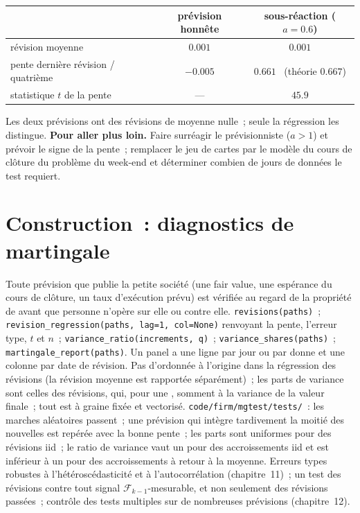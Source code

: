 \begin{tutorial}
\begin{center}
\begin{tabular}{@{}lcc@{}}
\toprule
 & prévision honnête & sous-réaction ($a = 0.6$) \\
\midrule
révision moyenne & $0.001$ & $0.001$ \\
pente dernière révision / quatrième & $-0.005$ & $0.661$ \ (théorie $0.667$) \\
statistique $t$ de la pente & --- & $45.9$ \\
\bottomrule
\end{tabular}
\end{center}
Les deux prévisions ont des révisions de moyenne nulle~; seule la régression les distingue.
\textbf{Pour aller plus loin.} Faire surréagir le prévisionniste ($a > 1$) et prévoir le signe de
la pente~; remplacer le jeu de cartes par le modèle du cours de clôture du problème du week-end et déterminer
combien de jours de données le test requiert.
\end{tutorial}


\section{Construction~: diagnostics de martingale}\label{bld:qm:probability-at-speed:mgtest}

\begin{build}
 Toute prévision que publie la petite société (une fair value, une espérance du
cours de clôture, un taux d'exécution prévu) est vérifiée au regard de la propriété de  avant que personne
n'opère sur elle ou contre elle.
 \texttt{revisions(paths)}~; \texttt{revision\_regression(paths, lag=1,
col=None)} renvoyant la pente, l'erreur type, $t$ et $n$~; \texttt{variance\_ratio(increments,
q)}~; \texttt{variance\_shares(paths)}~; \texttt{martingale\_report(paths)}. Un panel a une
ligne par jour ou par donne et une colonne par date de révision.
 Pas d'ordonnée à l'origine dans la régression des révisions (la révision moyenne est rapportée
séparément)~; les parts de variance sont celles des révisions, qui, pour une , somment à la
variance de la valeur finale~; tout est à graine fixée et vectorisé.
 \texttt{code/firm/mgtest/tests/}~: les marches aléatoires passent~; une prévision
qui intègre tardivement la moitié des nouvelles est repérée avec la bonne pente~; les parts sont uniformes pour des
révisions iid~; le ratio de variance vaut un pour des accroissements iid et est inférieur à un pour des
accroissements à retour à la moyenne.
 Erreurs types robustes à l'hétéroscédasticité et à l'autocorrélation (chapitre~11)~;
un test des révisions contre tout signal $\mathcal F_{k-1}$-mesurable, et non seulement des
révisions passées~; contrôle des tests multiples sur de nombreuses prévisions (chapitre~12).
\end{build}

